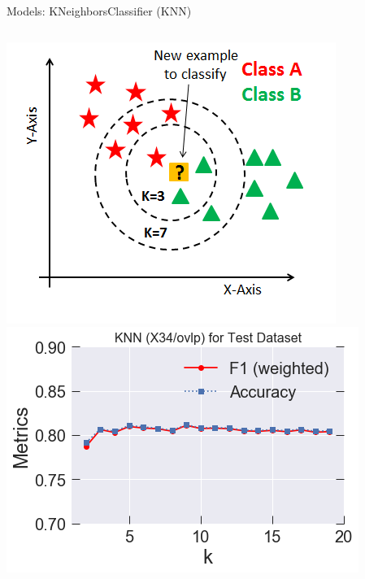 \documentclass{if-beamer}
\begin{document}
\begin{frame}{Models:  KNeighborsClassifier (KNN)} 

    \begin{columns}
    
   \begin{column}{0.5\textwidth} 
   \includegraphics[scale=0.3]{./figs/KNN.png}
   \includegraphics[scale=0.3]{./figs/knn_X34_half_test_score_k.png}

   \end{column} 
    
\begin{column}{0.5\textwidth}
 

\end{column}
\end{columns}
\end{frame}
\end{document}
